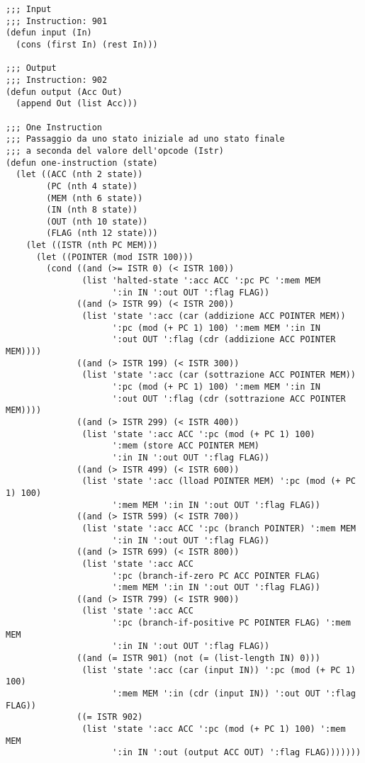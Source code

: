 \documentclass[a4paper,12pt, oneside]{book}
\begin{document}
\begin{verbatim}
;;; Input
;;; Instruction: 901
(defun input (In)
  (cons (first In) (rest In)))

;;; Output
;;; Instruction: 902
(defun output (Acc Out)
  (append Out (list Acc)))

;;; One Instruction
;;; Passaggio da uno stato iniziale ad uno stato finale
;;; a seconda del valore dell'opcode (Istr)
(defun one-instruction (state)
  (let ((ACC (nth 2 state))
        (PC (nth 4 state))
        (MEM (nth 6 state))
        (IN (nth 8 state))
        (OUT (nth 10 state))
        (FLAG (nth 12 state)))
    (let ((ISTR (nth PC MEM)))
      (let ((POINTER (mod ISTR 100)))
        (cond ((and (>= ISTR 0) (< ISTR 100))
               (list 'halted-state ':acc ACC ':pc PC ':mem MEM
                     ':in IN ':out OUT ':flag FLAG))
              ((and (> ISTR 99) (< ISTR 200))
               (list 'state ':acc (car (addizione ACC POINTER MEM))
                     ':pc (mod (+ PC 1) 100) ':mem MEM ':in IN 
                     ':out OUT ':flag (cdr (addizione ACC POINTER MEM))))
              ((and (> ISTR 199) (< ISTR 300))
               (list 'state ':acc (car (sottrazione ACC POINTER MEM)) 
                     ':pc (mod (+ PC 1) 100) ':mem MEM ':in IN 
                     ':out OUT ':flag (cdr (sottrazione ACC POINTER MEM))))
              ((and (> ISTR 299) (< ISTR 400))
               (list 'state ':acc ACC ':pc (mod (+ PC 1) 100) 
                     ':mem (store ACC POINTER MEM)
                     ':in IN ':out OUT ':flag FLAG))
              ((and (> ISTR 499) (< ISTR 600))
               (list 'state ':acc (lload POINTER MEM) ':pc (mod (+ PC 1) 100) 
                     ':mem MEM ':in IN ':out OUT ':flag FLAG))
              ((and (> ISTR 599) (< ISTR 700))
               (list 'state ':acc ACC ':pc (branch POINTER) ':mem MEM
                     ':in IN ':out OUT ':flag FLAG))
              ((and (> ISTR 699) (< ISTR 800))
               (list 'state ':acc ACC 
                     ':pc (branch-if-zero PC ACC POINTER FLAG) 
                     ':mem MEM ':in IN ':out OUT ':flag FLAG))
              ((and (> ISTR 799) (< ISTR 900))
               (list 'state ':acc ACC 
                     ':pc (branch-if-positive PC POINTER FLAG) ':mem MEM
                     ':in IN ':out OUT ':flag FLAG))
              ((and (= ISTR 901) (not (= (list-length IN) 0)))
               (list 'state ':acc (car (input IN)) ':pc (mod (+ PC 1) 100) 
                     ':mem MEM ':in (cdr (input IN)) ':out OUT ':flag FLAG))
              ((= ISTR 902)
               (list 'state ':acc ACC ':pc (mod (+ PC 1) 100) ':mem MEM
                     ':in IN ':out (output ACC OUT) ':flag FLAG)))))))


\end{verbatim}
\end{document}
